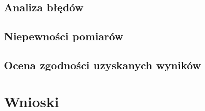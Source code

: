 \documentclass[a4paper,10pt,twoside]{article}
\begin{document}
\subsection{Analiza błędów}

\subsection{Niepewności pomiarów}


\subsection{Ocena zgodności uzyskanych wyników}

\section{Wnioski}
\end{document}
